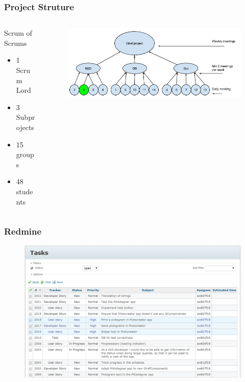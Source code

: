 \begin{frame}
	\begin{center}
		\frametitle{Project Struture}
		\begin{columns} %
			\begin{column}{.3\textwidth}
				Scrum of Scrums
				\begin{itemize}
					\item 1 Scrum Lord
					\item 3 Subprojects
					\item 15 groups
					\item 48 students
				\end{itemize}
			\end{column}%
			\begin{column}{.80\textwidth}
				\begin{figure}[H]
					\centering
					\includegraphics[width= 0.8 \textwidth]{pictures/ScrumOfScrum.png}
				\end{figure}
			\end{column}%
		\end{columns}
	\end{center}
\end{frame}

\begin{frame}
	\begin{center}
		\frametitle{Redmine}
		\begin{figure}[H]
			\centering
			\includegraphics[width= 0.8 \textwidth]{pictures/RedmineStory.png}
		\end{figure}
	\end{center}
\end{frame}

